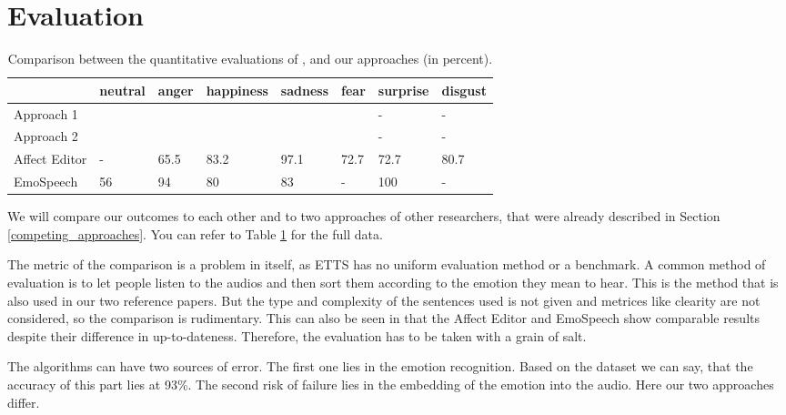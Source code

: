 \documentclass[11pt]{article}
\begin{document}
\section{Evaluation}
\label{evaluation}
\begin{table}[t]

\centering
\vspace{5px}
{
\begin{tabular}{|p{2cm}|p{1.5cm}|p{1.5cm}|p{1.5cm}|p{1.5cm}|p{1.5cm}|p{1.5cm}|p{1.5cm}|}
\hline
\rowcolor{mintgreen}&neutral&anger&happiness&sadness&fear&surprise&disgust\\
\hline
\cellcolor{gainsboro}Approach 1&&&&&&-&-\\
\hline
\cellcolor{gainsboro}Approach 2&&&&&&-&-\\
\hline
\hline
\cellcolor{gainsboro}Affect Editor& -&65.5&83.2&97.1&72.7&72.7&80.7\\
\hline
\cellcolor{gainsboro}EmoSpeech&56 &94&80 &83&-&100&-\\
\hline
\end{tabular}
}

\caption{Comparison between the quantitative evaluations of \cite{cahn_generation_2000}, \cite{diatlova_emospeech_2023} and our approaches (in percent).}
\label{Tabelle}
\end{table}
We will compare our outcomes to each other and to two approaches of other researchers, that were already described in Section \ref{competing_approaches}. You can refer to Table \ref{Tabelle} for the full data.

The metric of the comparison is a problem in itself, as ETTS has no uniform evaluation method or a benchmark. A common method of evaluation is to let people listen to the audios and then sort them according to the emotion they mean to hear. This is the method that is also used in our two reference papers. But the type and complexity of the sentences used is not given and metrices like clearity are not considered, so the comparison is rudimentary. This can also be seen in that the Affect Editor and EmoSpeech show comparable results despite their difference in up-to-dateness. Therefore, the evaluation has to be taken with a grain of salt.

The algorithms can have two sources of error. The first one lies in the emotion recognition. Based on the \cite{saravia-etal-2018-carer} dataset we can say, that the accuracy of this part lies at 93\%. The second risk of failure lies in the embedding of the emotion into the audio. Here our two approaches differ.
\end{document}
